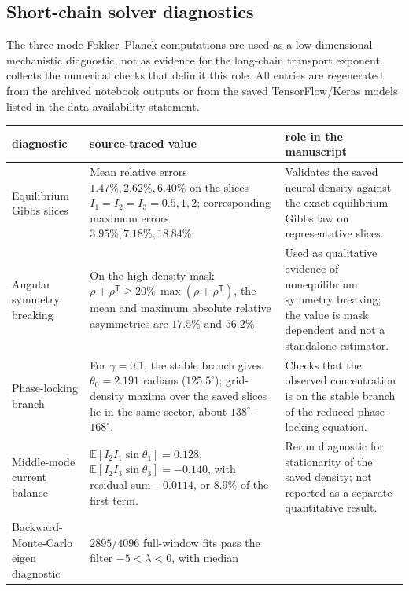 \documentclass[11pt,a4paper]{article}
\theoremstyle{definition}
\newcommand{\E}{\mathbb{E}}
\numberwithin{equation}{section}   %
\begin{document}
\subsection{Short-chain solver diagnostics}
\label{app:short-chain-diagnostics}

The three-mode Fokker--Planck computations are used as a low-dimensional
mechanistic diagnostic, not as evidence for the long-chain transport exponent.
 collects the numerical checks that delimit
this role. All entries are regenerated from the archived notebook outputs or
from the saved TensorFlow/Keras models listed in the data-availability
statement.

\begin{table}[ht]\centering
\small
\begin{tabular}{>{\raggedright\arraybackslash}p{}
                >{\raggedright\arraybackslash}p{}
                >{\raggedright\arraybackslash}p{}}
\toprule
diagnostic & source-traced value & role in the manuscript \\
\midrule
Equilibrium Gibbs slices &
Mean relative errors $1.47\%,2.62\%,6.40\%$ on the slices
$I_1=I_2=I_3=0.5,1,2$; corresponding maximum errors
$3.95\%,7.18\%,18.84\%$. &
Validates the saved neural density against the exact equilibrium Gibbs law on
representative slices. \\
\midrule
Angular symmetry breaking &
On the high-density mask
$\rho+\rho^{\mathsf T}\ge 20\%\,\max(\rho+\rho^{\mathsf T})$, the mean and
maximum absolute relative asymmetries are $17.5\%$ and $56.2\%$. &
Used as qualitative evidence of nonequilibrium symmetry breaking; the value is
mask dependent and not a standalone estimator. \\
\midrule
Phase-locking branch &
For $\gamma=0.1$, the stable branch gives
$\theta_0=2.191$ radians ($125.5^\circ$); grid-density maxima over the saved
slices lie in the same sector, about $138^\circ$--$168^\circ$. &
Checks that the observed concentration is on the stable branch of the reduced
phase-locking equation. \\
\midrule
Middle-mode current balance &
$\E[I_2I_1\sin\theta_1]=0.128$,
$\E[I_2I_3\sin\theta_3]=-0.140$, with residual sum $-0.0114$,
or $8.9\%$ of the first term. &
Rerun diagnostic for stationarity of the saved density; not reported as a
separate quantitative result. \\
\midrule
Backward-Monte-Carlo eigen diagnostic &
$2895/4096$ full-window fits pass the filter $-5<\lambda<0$, with median

\end{tabular}
\end{table}
\end{document}
